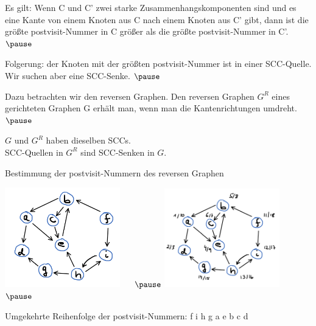 \begin{frame}[fragile] 
Es gilt: Wenn C und C' zwei starke Zusammenhangskomponenten sind und es eine Kante von einem Knoten aus C nach einem Knoten aus C' gibt, dann ist  die größte postvisit-Nummer in C größer als die größte postvisit-Nummer in C'. $\pause$    

Folgerung: der Knoten mit der größten postvisit-Nummer ist in einer SCC-Quelle. Wir suchen aber eine SCC-Senke. $\pause$    

Dazu betrachten wir den reversen Graphen. Den reversen Graphen $G^R$ eines gerichteten Graphen G erhält man, wenn
man die Kantenrichtungen umdreht. $\pause$    

$G$ und $G^R$ haben dieselben SCCs. \\
SCC-Quellen in $G^R$ sind SCC-Senken in $G$.

\end{frame}

\begin{frame}[fragile]
Bestimmung der postvisit-Nummern des reversen Graphen

\includegraphics[width=5cm]{bild18.png} ~~  $\pause$    
\includegraphics[width=5cm]{bild19.png} ~~  $\pause$    

Umgekehrte Reihenfolge der postvisit-Nummern: f i h g a e b c d

\end{frame}


